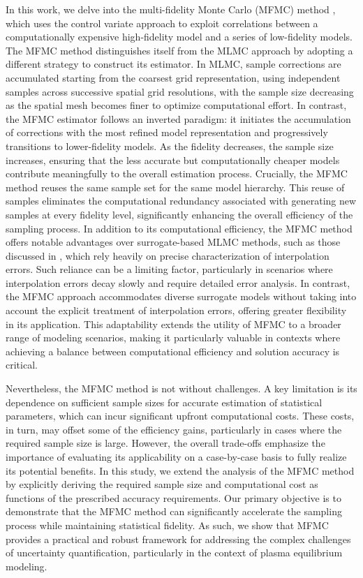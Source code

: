 In this work, we delve into the multi-fidelity Monte Carlo (MFMC) method \cite{PeWiGu:2016, PeGuWi:2018}, which uses the control variate approach to exploit correlations between a computationally expensive high-fidelity model and a series of low-fidelity models. The MFMC method distinguishes itself from the MLMC approach by adopting a different strategy to construct its estimator. In MLMC, sample corrections are accumulated starting from the coarsest grid representation, using independent samples across successive spatial grid resolutions, with the sample size decreasing as the spatial mesh becomes finer to optimize computational effort. In contrast, the MFMC estimator follows an inverted paradigm: it initiates the accumulation of corrections with the most refined model representation and progressively transitions to lower-fidelity models. As the fidelity decreases, the sample size increases, ensuring that the less accurate but computationally cheaper models contribute meaningfully to the overall estimation process. Crucially, the MFMC method reuses the same sample set for the same model hierarchy. This reuse of samples eliminates the computational redundancy associated with generating new samples at every fidelity level, significantly enhancing the overall efficiency of the sampling process. In addition to its computational efficiency, the MFMC method offers notable advantages over surrogate-based MLMC methods, such as those discussed in \cite{Li:2024}, which rely heavily on precise characterization of interpolation errors. Such reliance can be a limiting factor, particularly in scenarios where interpolation errors decay slowly and require detailed error analysis. In contrast, the MFMC approach accommodates diverse surrogate models without taking into account the explicit treatment of interpolation errors, offering greater flexibility in its application. This adaptability extends the utility of MFMC to a broader range of modeling scenarios, making it particularly valuable in contexts where achieving a balance between computational efficiency and solution accuracy is critical. 

Nevertheless, the MFMC method is not without challenges. A key limitation is its dependence on sufficient sample sizes for accurate estimation of statistical parameters, which can incur significant upfront computational costs. These costs, in turn, may offset some of the efficiency gains, particularly in cases where the required sample size is large. However, the overall trade-offs emphasize the importance of evaluating its applicability on a case-by-case basis to fully realize its potential benefits. In this study, we extend the analysis of the MFMC method \cite{PeWiGu:2016} by explicitly deriving the required sample size and computational cost as functions of the prescribed accuracy requirements. Our primary objective is to demonstrate that the MFMC method can significantly accelerate the sampling process while maintaining statistical fidelity. As such, we show that  MFMC provides a practical and robust framework for addressing the complex challenges of uncertainty quantification, particularly in the context of plasma equilibrium modeling.


